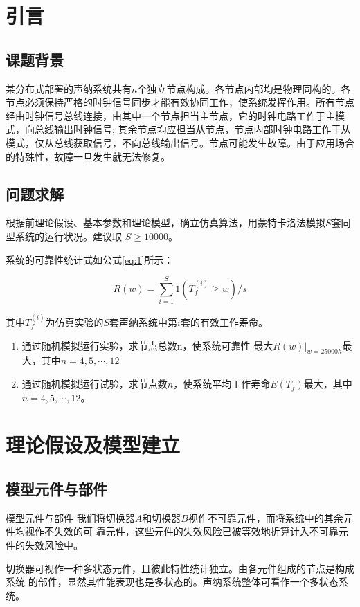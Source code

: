 \documentclass[10.5pt,twocolumn]{jbuaa}
\begin{document}
\section{引言}
\subsection{课题背景\cite{cite1}}
某分布式部署的声纳系统共有$n$个独立节点构成。各节点内部均是物理同构的。各节点必须保持严格的时钟信号同步才能有效协同工作，使系统发挥作用。所有节点经由时钟信号总线连接，由其中一个节点担当主节点，它的时钟电路工作于主模式，向总线输出时钟信号; 其余节点均应担当从节点，节点内部时钟电路工作于从模式，仅从总线获取信号，不向总线输出信号。节点可能发生故障。由于应用场合的特殊性，故障一旦发生就无法修复。
\subsection{问题求解}
根据前理论假设、基本参数和理论模型，确立仿真算法，用蒙特卡洛法模拟$S$套同型系统的运行状况。建议取 $S \geq 10000$。

系统的可靠性统计式如公式\eqref{eq:1}所示：

\begin{equation}
	R(w) = \sum_{i = 1}^{S}1(T_f^{(i)} \geq w) / s
	\label{eq:1}
\end{equation}

其中$T_f^{(i)}$为仿真实验的$S$套声纳系统中第$i$套的有效工作寿命。

\begin{enumerate}
	\item 通过随机模拟运行实验，求节点总数n，使系统可靠性 最大$R(w)|_{w = 25000h}$最大，其中$n = 4, 5, \cdots, 12$
	\item 通过随机模拟运行试验，求节点数$n$，使系统平均工作寿命$E(T_f)$最大，其中$n = 4, 5, \cdots, 12$。
\end{enumerate}
\section{理论假设及模型建立\cite{cite1}}
\subsection{模型元件与部件}
 模型元件与部件
我们将切换器$A$和切换器$B$视作不可靠元件，而将系统中的其余元件均视作不失效的可
靠元件，这些元件的失效风险已被等效地折算计入不可靠元件的失效风险中。 

切换器可视作一种多状态元件，且彼此特性统计独立。由各元件组成的节点是构成系统
的部件，显然其性能表现也是多状态的。声纳系统整体可看作一个多状态系统。
\end{document}
